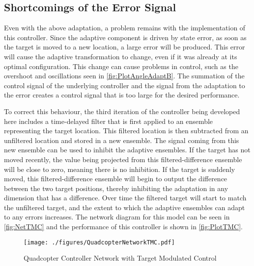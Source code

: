 \documentclass[letterpaper,12pt,titlepage,oneside,final]{book}
\begin{document}
\subsection{Shortcomings of the Error Signal}

Even with the above adaptation, a problem remains with the implementation of this controller. 
Since the adaptive component is driven by state error, as soon as the target is moved to a new location, a large error will be produced. 
This error will cause the adaptive transformation to change, even if it was already at its optimal configuration. 
This change can cause problems in control, such as the overshoot and oscillations seen in \autoref{fig:PlotAngleAdaptB}. 
The summation of the control signal of the underlying controller and the signal from the adaptation to the error creates a control signal that is too large for the desired performance.

To correct this behaviour, the third iteration of the controller being developed here includes a time-delayed filter that is first applied to an ensemble representing the target location. 
This filtered location is then subtracted from an unfiltered location and stored in a new ensemble. 
The signal coming from this new ensemble can be used to inhibit the adaptive ensembles. 
If the target has not moved recently, the value being projected from this filtered-difference ensemble will be close to zero, meaning there is no inhibition. 
If the target is suddenly moved, this filtered-difference ensemble will begin to output the difference between the two target positions, thereby inhibiting the adaptation in any dimension that has a difference. 
Over time the filtered target will start to match the unfiltered target, and the extent to which the adaptive ensembles can adapt to any errors increases. 
The network diagram for this model can be seen in \autoref{fig:NetTMC} and the performance of this controller is shown in \autoref{fig:PlotTMC}.


\begin{figure}
\centering
\texttt{[image: ./figures/QuadcopterNetworkTMC.pdf]} %
\caption{Quadcopter Controller Network with Target Modulated Control}
\label{fig:NetTMC}
\end{figure}
\end{document}
